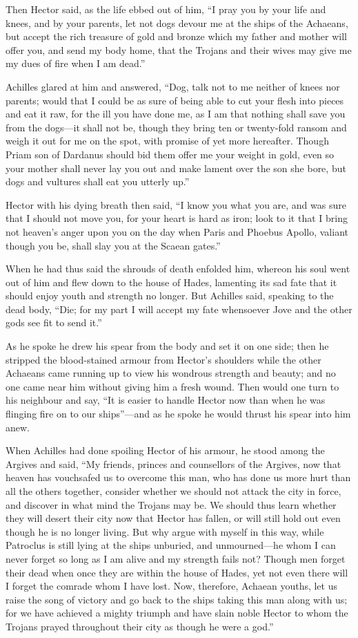 Then Hector said, as the life ebbed out of him, “I pray you by your life
and knees, and by your parents, let not dogs devour me at the ships of the
Achaeans, but accept the rich treasure of gold and bronze which my father
and mother will offer you, and send my body home, that the Trojans and
their wives may give me my dues of fire when I am dead.”

Achilles glared at him and answered, “Dog, talk not to me neither of knees
nor parents; would that I could be as sure of being able to cut your flesh
into pieces and eat it raw, for the ill you have done me, as I am that
nothing shall save you from the dogs—it shall not be, though they
bring ten or twenty-fold ransom and weigh it out for me on the spot, with
promise of yet more hereafter. Though Priam son of Dardanus should bid
them offer me your weight in gold, even so your mother shall never lay you
out and make lament over the son she bore, but dogs and vultures shall eat
you utterly up.”

Hector with his dying breath then said, “I know you what you are, and was
sure that I should not move you, for your heart is hard as iron; look to
it that I bring not heaven’s anger upon you on the day when Paris and
Phoebus Apollo, valiant though you be, shall slay you at the Scaean
gates.”

When he had thus said the shrouds of death enfolded him, whereon his soul
went out of him and flew down to the house of Hades, lamenting its sad
fate that it should enjoy youth and strength no longer. But Achilles said,
speaking to the dead body, “Die; for my part I will accept my fate
whensoever Jove and the other gods see fit to send it.”

As he spoke he drew his spear from the body and set it on one side; then
he stripped the blood-stained armour from Hector’s shoulders while the
other Achaeans came running up to view his wondrous strength and beauty;
and no one came near him without giving him a fresh wound. Then would one
turn to his neighbour and say, “It is easier to handle Hector now than
when he was flinging fire on to our ships”—and as he spoke he would
thrust his spear into him anew.

When Achilles had done spoiling Hector of his armour, he stood among the
Argives and said, “My friends, princes and counsellors of the Argives, now
that heaven has vouchsafed us to overcome this man, who has done us more
hurt than all the others together, consider whether we should not attack
the city in force, and discover in what mind the Trojans may be. We should
thus learn whether they will desert their city now that Hector has fallen,
or will still hold out even though he is no longer living. But why argue
with myself in this way, while Patroclus is still lying at the ships
unburied, and unmourned—he whom I can never forget so long as I am
alive and my strength fails not? Though men forget their dead when once
they are within the house of Hades, yet not even there will I forget the
comrade whom I have lost. Now, therefore, Achaean youths, let us raise the
song of victory and go back to the ships taking this man along with us;
for we have achieved a mighty triumph and have slain noble Hector to whom
the Trojans prayed throughout their city as though he were a god.”


